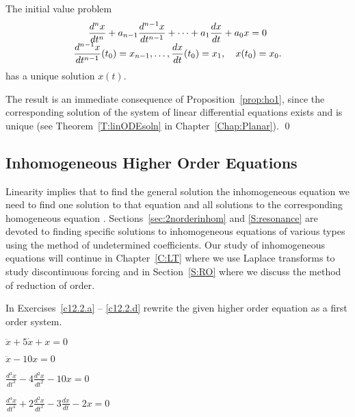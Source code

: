 \arraystart
\begin{thm}
The initial value problem
\begin{equation}
\begin{array}{c}
\displaystyle \frac{d^nx}{dt^n} + a_{n-1}\frac{d^{n-1}x}{dt^{n-1}} +
\cdots + a_1\frac{dx}{dt}+a_0x = 0\\
\displaystyle \frac{d^{n-1}x}{dt^{n-1}}(t_0)=x_{n-1},\ldots,\frac{dx}{dt}(t_0)=x_1,\quad
x(t_0)=x_0.
\end{array}
\end{equation}
has a unique solution $x(t)$.
\end{thm}
\arrayfinish

\proof The result is an immediate consequence of Proposition~\ref{prop:ho1},
since the corresponding solution of the system of linear differential
equations exists and is unique (see Theorem~\ref{T:linODEsoln} in 
Chapter~\ref{Chap:Planar}).
\qed

\subsection*{Inhomogeneous Higher Order Equations}

Linearity implies that to find the 
general solution the inhomogeneous
equation  we need to find one solution to that equation 
and all solutions to the corresponding homogeneous equation 
.  Sections~\ref{sec:2norderinhom} and \ref{S:resonance} 
are devoted to finding specific solutions to inhomogeneous equations of 
various types using the method of undetermined coefficients.  Our study of
inhomogeneous equations will continue in Chapter~\ref{C:LT} where we use 
Laplace transforms to study discontinuous forcing and in Section~\ref{S:RO}  
where we discuss the method of reduction of order.



\EXER

\TEXER


\noindent In Exercises~\ref{c12.2.a} -- \ref{c12.2.d} rewrite the given
higher order equation as a first order system.
\begin{exercise} \label{c12.2.a}
$\ddot{x}+5\dot{x}+x = 0$
\end{exercise}
\begin{exercise} \label{c12.2.b}
$\ddot{x}-10x = 0$
\end{exercise}
\begin{exercise} \label{c12.2.c}
$\frac{d^3x}{dt^3}-4\frac{d^2x}{dt^2}-10x = 0$
\end{exercise}
\begin{exercise} \label{c12.2.d}
$\frac{d^4x}{dt^4}+2\frac{d^2x}{dt^2}-3\frac{dx}{dt}-2x = 0$
\end{exercise}

